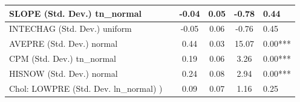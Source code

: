 \begin{table}
\begin{center}
\begin{tabular}{|l|l|c|c|c|l|}
			\hline
			SLOPE (Std. Dev.) tn_normal &  & -0.04 & 0.05 & -0.78 & 0.44 \\
			\hline
			INTECHAG (Std. Dev.) uniform &  & -0.05 & 0.06 & -0.76 & 0.45 \\
			\hline
			AVEPRE (Std. Dev.) normal &  & 0.44 & 0.03 & 15.07 & 0.00*** \\
			\hline
			CPM (Std. Dev.) tn_normal &  & 0.19 & 0.06 & 3.26 & 0.00*** \\
			\hline
			HISNOW (Std. Dev.) normal &  & 0.24 & 0.08 & 2.94 & 0.00*** \\
			\hline
			 Chol: LOWPRE (Std. Dev. ln_normal) ) &  & 0.09 & 0.07 & 1.16 & 0.25 \\
			\hline
		\end{tabular}
	\end{center}
\end{table}